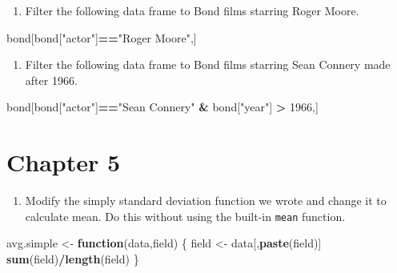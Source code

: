\documentclass[
]{book}
\newenvironment{Shaded}{\begin{snugshade}}{\end{snugshade}}
\newcommand{\ControlFlowTok}[1]{\textcolor[rgb]{0.13,0.29,0.53}{\textbf{#1}}}
\newcommand{\DecValTok}[1]{\textcolor[rgb]{0.00,0.00,0.81}{#1}}
\newcommand{\KeywordTok}[1]{\textcolor[rgb]{0.13,0.29,0.53}{\textbf{#1}}}
\newcommand{\NormalTok}[1]{#1}
\newcommand{\OperatorTok}[1]{\textcolor[rgb]{0.81,0.36,0.00}{\textbf{#1}}}
\newcommand{\StringTok}[1]{\textcolor[rgb]{0.31,0.60,0.02}{#1}}
\providecommand{\tightlist}{%
  \setlength{\itemsep}{0pt}\setlength{\parskip}{0pt}}
\begin{document}
\begin{center}
\begin{enumerate}
\def\labelenumi{\arabic{enumi}.}
\setcounter{enumi}{5}
\tightlist
\item
  Filter the following data frame to Bond films starring Roger Moore.
\end{enumerate}

\begin{Shaded}
\begin{Highlighting}[]
\NormalTok{  bond[bond[}\StringTok{"actor"}\NormalTok{]}\OperatorTok{==}\StringTok{"Roger Moore"}\NormalTok{,]}
\end{Highlighting}
\end{Shaded}

\begin{enumerate}
\def\labelenumi{\arabic{enumi}.}
\setcounter{enumi}{6}
\tightlist
\item
  Filter the following data frame to Bond films starring Sean Connery made after 1966.
\end{enumerate}

\begin{Shaded}
\begin{Highlighting}[]
\NormalTok{  bond[bond[}\StringTok{"actor"}\NormalTok{]}\OperatorTok{==}\StringTok{"Sean Connery"} \OperatorTok{&}\StringTok{ }\NormalTok{bond[}\StringTok{"year"}\NormalTok{] }\OperatorTok{>}\StringTok{ }\DecValTok{1966}\NormalTok{,]}
\end{Highlighting}
\end{Shaded}

\hypertarget{chapter-5}{%
\section{Chapter 5}\label{chapter-5}}

\begin{enumerate}
\def\labelenumi{\arabic{enumi}.}
\tightlist
\item
  Modify the simply standard deviation function we wrote and change it to calculate mean. Do this without using the built-in \texttt{mean} function.
\end{enumerate}

\begin{Shaded}
\begin{Highlighting}[]
\NormalTok{  avg.simple <-}\StringTok{ }\ControlFlowTok{function}\NormalTok{(data,field) \{}
\NormalTok{    field <-}\StringTok{ }\NormalTok{data[,}\KeywordTok{paste}\NormalTok{(field)]}
    \KeywordTok{sum}\NormalTok{(field)}\OperatorTok{/}\KeywordTok{length}\NormalTok{(field)}
\NormalTok{  \}}
\end{Highlighting}
\end{Shaded}


\end{center}
\end{document}
